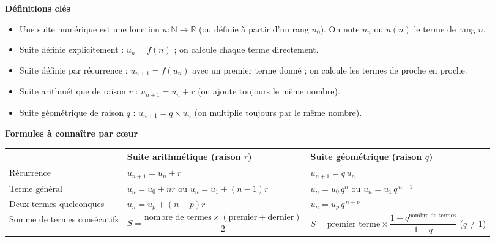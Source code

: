 \documentclass[11pt]{article}
\newcommand{\cle}[1]{{\popxbold\color{popdark}#1}}
\begin{document}
\begin{bilan}
\textbf{Définitions clés}
\begin{itemize}
  \item Une \cle{suite numérique} est une fonction $u:\mathbb{N}\to\mathbb{R}$ (ou définie à partir d'un rang $n_0$). On note $u_n$ ou $u(n)$ le \cle{terme} de rang $n$.
  \item Suite définie \cle{explicitement} : $u_n=f(n)$ ; on calcule chaque terme directement.
  \item Suite définie par \cle{récurrence} : $u_{n+1}=f(u_n)$ avec un premier terme donné ; on calcule les termes de proche en proche.
  \item Suite \cle{arithmétique} de raison $r$ : $u_{n+1}=u_n+r$ (on ajoute toujours le même nombre).
  \item Suite \cle{géométrique} de raison $q$ : $u_{n+1}=q\times u_n$ (on multiplie toujours par le même nombre).
\end{itemize}

\textbf{Formules à connaître par cœur}

\begin{center}
\begin{tabularx}{\linewidth}{|l|X|X|}
\hline
\rowcolor{popblueL} & \textbf{Suite arithmétique (raison $r$)} & \textbf{Suite géométrique (raison $q$)} \\
\hline
Récurrence & $u_{n+1}=u_n+r$ & $u_{n+1}=q\,u_n$ \\
\hline
Terme général & $u_n=u_0+nr$ \; ou \; $u_n=u_1+(n-1)r$ & $u_n=u_0\,q^{n}$ \; ou \; $u_n=u_1\,q^{\,n-1}$ \\
\hline
Deux termes quelconques & $u_n=u_p+(n-p)r$ & $u_n=u_p\,q^{\,n-p}$ \\
\hline
Somme de termes consécutifs & $S=\dfrac{\text{nombre de termes}\times(\text{premier}+\text{dernier})}{2}$ & $S=\text{premier terme}\times\dfrac{1-q^{\text{nombre de termes}}}{1-q}$ \; ($q\neq 1$) \\
\hline
\end{tabularx}
\end{center}


\end{bilan}
\end{document}

